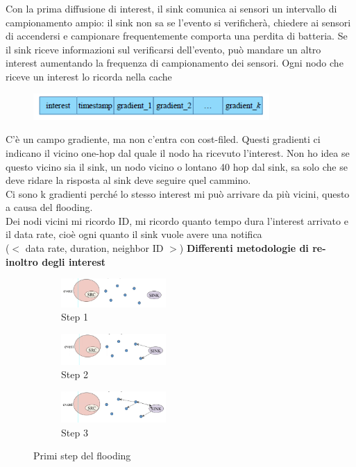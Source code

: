 \documentclass[12pt,italian]{report}
\begin{document}
\bigbreak
Con la prima diffusione di interest, il sink comunica ai sensori un intervallo di campionamento ampio: il sink non sa se l'evento si verificherà, chiedere ai sensori di accendersi e campionare frequentemente comporta una perdita di batteria. Se il sink riceve informazioni sul verificarsi dell'evento, può mandare un altro interest aumentando la frequenza di campionamento dei sensori. Ogni nodo che riceve un interest lo ricorda nella cache
\begin{figure}[h]
	\centering
    \includegraphics[width=90mm]{img/interest.PNG}
\end{figure}
\bigbreak
C'è un campo gradiente, ma non c'entra con cost-filed. Questi gradienti ci indicano il vicino one-hop dal quale il nodo ha ricevuto l'interest. Non ho idea se questo vicino sia il sink, un nodo vicino o lontano 40 hop dal sink, sa solo che se deve ridare la risposta al sink deve seguire quel cammino. \\ Ci sono k gradienti perché lo stesso interest mi può arrivare da più vicini, questo a causa del flooding. \\ Dei nodi vicini mi ricordo ID, mi ricordo quanto tempo dura l'interest arrivato e il data rate, cioè ogni quanto il sink vuole avere una notifica \\ ($<$ data rate, duration, neighbor ID $>$) 
\bigbreak
\noindent \textbf{Differenti metodologie di re-inoltro degli interest} 
\begin{figure}[h]
     \centering
     \begin{subfigure}[b]{0.3\textwidth}
         \centering
         \includegraphics[width=40mm]{img/r1.PNG}
         \caption{Step 1}
     \end{subfigure}
     \hfill
     \begin{subfigure}[b]{0.3\textwidth}
         \centering
          \includegraphics[width=40mm]{img/r2.PNG}
          \caption{Step 2}
     \end{subfigure}
     \hfill
     \begin{subfigure}[b]{0.3\textwidth}
         \centering
         \includegraphics[width=40mm]{img/r3.PNG}
         \caption{Step 3}
     \end{subfigure}
     
    \caption{Primi step del flooding}
    \label{fig:flood}
    
\end{figure}
    
\end{document}
